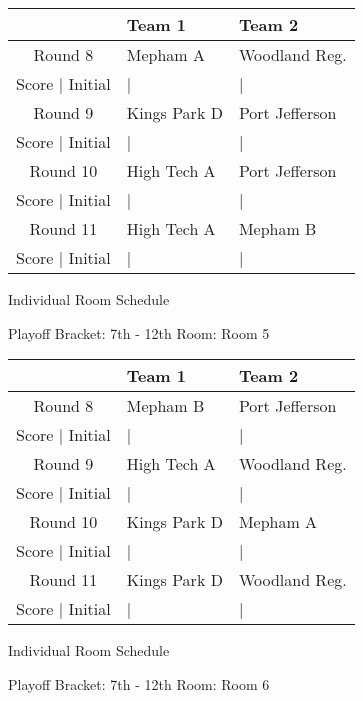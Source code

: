 \documentclass{article}%
\begin{document}
%
\begin{tabularx}{\textwidth}{|c|Y|Y|}%
\hline%
&Team 1&Team 2\\%
\hline%
Round 8&Mepham A&Woodland Reg.\\%
\hline%
Score | Initial&|&|\\%
\hline%
Round 9&Kings Park D&Port Jefferson\\%
\hline%
Score | Initial&|&|\\%
\hline%
Round 10&High Tech A&Port Jefferson\\%
\hline%
Score | Initial&|&|\\%
\hline%
Round 11&High Tech A&Mepham B\\%
\hline%
Score | Initial&|&|\\%
\hline%
\end{tabularx}%
\vspace*{16pt}%
\linebreak%
\newpage%
\begin{center}%
\begin{Huge}%
Individual Room Schedule%
\end{Huge}%
\vspace*{16pt}%
\linebreak%
\begin{Large}%
Playoff Bracket: 7th - 12th \hfill Room: Room 5%
\end{Large}%
\end{center}%
%
\begin{tabularx}{\textwidth}{|c|Y|Y|}%
\hline%
&Team 1&Team 2\\%
\hline%
Round 8&Mepham B&Port Jefferson\\%
\hline%
Score | Initial&|&|\\%
\hline%
Round 9&High Tech A&Woodland Reg.\\%
\hline%
Score | Initial&|&|\\%
\hline%
Round 10&Kings Park D&Mepham A\\%
\hline%
Score | Initial&|&|\\%
\hline%
Round 11&Kings Park D&Woodland Reg.\\%
\hline%
Score | Initial&|&|\\%
\hline%
\end{tabularx}%
\vspace*{16pt}%
\linebreak%
\newpage%
\begin{center}%
\begin{Huge}%
Individual Room Schedule%
\end{Huge}%
\vspace*{16pt}%
\linebreak%
\begin{Large}%
Playoff Bracket: 7th - 12th \hfill Room: Room 6%
\end{Large}%
\end{center}%
\end{document}
